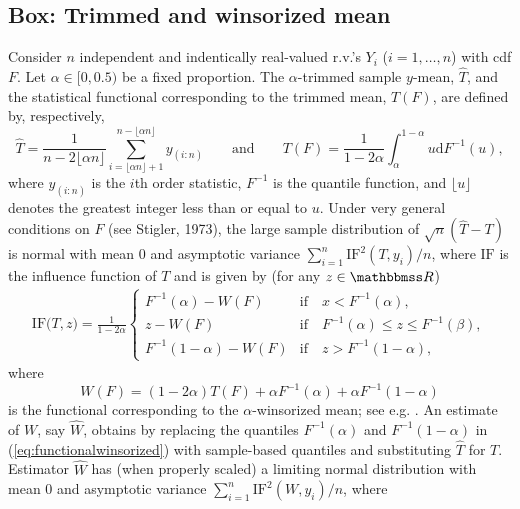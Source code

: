 \documentclass[a4paper,oneside,11pt,DIV=12]{scrartcl}
\newcommand{\R}{{\mathbbmss R}}         %
\theoremstyle{remark}
\begin{document}
\subsection{Box: Trimmed and winsorized mean}
Consider $n$ independent and indentically real-valued r.v.'s $Y_i$ ($i=1,\ldots,n$) with cdf $F$. Let $\alpha \in [0, 0.5)$ be a fixed proportion. The $\alpha$-trimmed sample $y$-mean, $\widehat{T}$, and the statistical functional corresponding to the trimmed mean, $T(F)$, are defined by, respectively,
\begin{equation*}
   \widehat{T} = \frac{1}{n-2\lfloor \alpha n\rfloor}\sum_{i=\lfloor \alpha n\rfloor + 1}^{n - \lfloor \alpha n\rfloor}y_{(i:n)} \qquad  \text{and} \qquad  T(F) = \frac{1}{1 - 2\alpha} \int_{\alpha}^{1-\alpha} u \mathrm{d} F^{-1}(u),
\end{equation*}
\noindent where $y_{(i:n)}$ is the $i$th order statistic, $F^{-1}$ is the quantile function, and $\lfloor u \rfloor$ denotes the greatest integer less than or equal to $u$. Under very general conditions on $F$ (see Stigler, 1973), the large sample distribution of $\sqrt{n}(\widehat{T} - T)$ is normal with mean 0 and asymptotic variance $\sum_{i=1}^n \mathrm{IF}^2(T,y_i)/n$, where $\mathrm{IF}$ is the influence function of $T$ and is given by (for any $z \in \R$)
\begin{align*}
   \mathrm{IF}\big(T, z\big) = \frac{1}{1-2\alpha}
   \begin{cases}
      F^{-1}(\alpha) - W(F) & \text{if} \quad x < F^{-1}(\alpha),\\
      z - W(F) & \text{if} \quad F^{-1}(\alpha) \leq z \leq F^{-1}(\beta),\\
      F^{-1}(1-\alpha) - W(F) & \text{if} \quad z > F^{-1}(1-\alpha), 
   \end{cases}
\end{align*}
\noindent where
\begin{equation}\label{eq:functionalwinsorized}
   W(F) = (1 - 2\alpha )T(F) + \alpha F^{-1}(\alpha) + \alpha F^{-1}(1-\alpha)
\end{equation}
\noindent is the functional corresponding to the $\alpha$-winsorized mean; see e.g. \citet[][p. 58]{huber_1981}. An estimate of $W$, say $\widehat{W}$, obtains by replacing the quantiles $F^{-1}(\alpha)$ and $F^{-1}(1-\alpha)$ in (\ref{eq:functionalwinsorized}) with sample-based quantiles and substituting $\widehat{T}$ for $T$. Estimator $\widehat{W}$ has (when properly scaled) a limiting normal distribution with mean 0 and asymptotic variance $\sum_{i=1}^n \mathrm{IF}^2(W,y_i) / n$, where \citep[see e.g.][58--59]{huber_1981}
\end{document}
